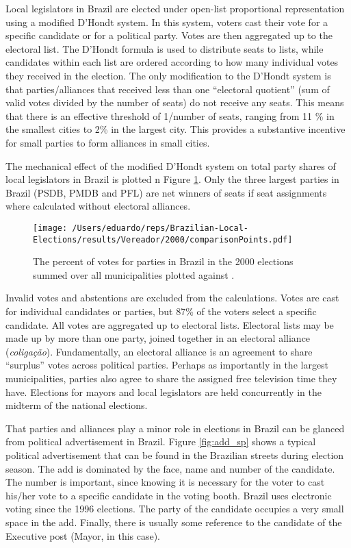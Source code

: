 Local legislators in Brazil are elected under open-list proportional representation using a modified D'Hondt system. In this system,  voters  cast their vote for a specific candidate or for a political party. Votes are then aggregated up to the electoral list. The D'Hondt formula is used to distribute seats to lists, while  candidates within each list are ordered according to how many individual votes they received in the election.  The only modification to the D'Hondt system is that parties/alliances that received less than one ``electoral quotient'' (sum of valid votes divided by the number of seats) do not receive any seats. This means that there is an effective threshold of 1/number of seats, ranging from 11 \% in the smallest cities to 2\% in the largest city. This provides a substantive incentive for small parties to form alliances in small cities. 

The mechanical effect of the modified D'Hondt system on total party shares of local legislators in Brazil is plotted n Figure \ref{fig:comp}.  Only the three largest parties in Brazil (PSDB, PMDB and PFL) are net winners of seats if seat assignments where calculated without electoral alliances.   

 \begin{figure}
  \centering
  \texttt{[image: /Users/eduardo/reps/Brazilian-Local-Elections/results/Vereador/2000/comparisonPoints.pdf]}
  \caption{The percent of votes for parties in Brazil in the 2000 elections summed over all municipalities plotted against .  }
  \label{fig:comp}
\end{figure}


Invalid votes and abstentions are excluded from the calculations. Votes are cast for individual candidates or parties, but  87\% of the voters select a specific candidate. All votes are aggregated up to electoral lists. Electoral lists may be made up by more than one party, joined together in an electoral alliance (\emph{coligação}). Fundamentally, an electoral alliance is an agreement to share ``surplus'' votes across political parties. Perhaps as importantly in the largest municipalities, parties also agree to share the assigned free television time they have. Elections for mayors and local legislators are held concurrently in the midterm of the national elections.

That parties and alliances play a minor role in elections in Brazil can be glanced from political advertisement in Brazil.  Figure \ref{fig:add_sp} shows a typical political advertisement that can be found in the Brazilian streets during election season. The add is dominated by the face,   name and number of the candidate. The number is important, since knowing it is necessary for the voter to cast his/her vote to a specific candidate in the voting booth. Brazil uses electronic voting since the 1996 elections. The party of the candidate occupies a very small space in the add. Finally, there is usually some reference to the candidate of the Executive post (Mayor, in this case). 

